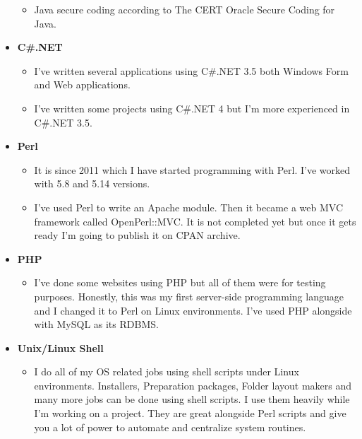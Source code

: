 \documentclass[12pt,a4paper]{article}
\begin{document}
\begin{itemize}
\begin{itemize}
					\item Java secure coding according to The CERT Oracle Secure Coding for Java.
				\end{itemize}
			\item \textbf{C\#.NET}
				\begin{itemize}
					\item I've written several applications using C\#.NET 3.5 both Windows Form and Web applications.
					\item I've written some projects using C\#.NET 4 but I'm more experienced in C\#.NET 3.5.
				\end{itemize}
			\item \textbf{Perl} 
				\begin{itemize}
					\item It is since 2011 which I have started programming with Perl. I've worked with 5.8 and 5.14 versions.
					\item I've used Perl to write an Apache module. Then it became a web MVC framework called OpenPerl::MVC. It is not completed yet but once it gets ready I'm going to publish it on CPAN archive.
				\end{itemize}
			\item \textbf{PHP}
				\begin{itemize}
					\item I've done some websites using PHP but all of them were for testing purposes. Honestly, this was my first server-side programming language and I changed it to Perl on Linux environments. I've used PHP alongside with MySQL as its RDBMS.
				\end{itemize}
			\item \textbf{Unix/Linux Shell}
				\begin{itemize}
					\item I do all of my OS related jobs using shell scripts under Linux environments. Installers, Preparation packages, Folder layout makers and many more jobs can be done using shell scripts. I use them heavily while I'm working on a project. They are great alongside Perl scripts and give you a lot of power to automate and centralize system routines.
				\end{itemize}
		\end{itemize}
		
\end{document}
